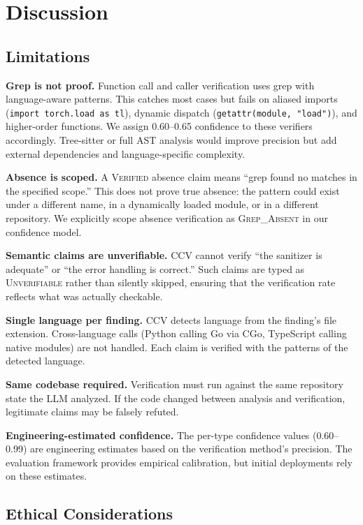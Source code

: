 \section{Discussion}
\label{sec:discussion}

\subsection{Limitations}

\textbf{Grep is not proof.} Function call and caller verification uses grep with language-aware patterns. This catches most cases but fails on aliased imports (\texttt{import torch.load as tl}), dynamic dispatch (\texttt{getattr(module, "load")}), and higher-order functions. We assign 0.60--0.65 confidence to these verifiers accordingly. Tree-sitter or full AST analysis would improve precision but add external dependencies and language-specific complexity.

\textbf{Absence is scoped.} A \textsc{Verified} absence claim means ``grep found no matches in the specified scope.'' This does not prove true absence: the pattern could exist under a different name, in a dynamically loaded module, or in a different repository. We explicitly scope absence verification as \textsc{Grep\_Absent} in our confidence model.

\textbf{Semantic claims are unverifiable.} CCV cannot verify ``the sanitizer is adequate'' or ``the error handling is correct.'' Such claims are typed as \textsc{Unverifiable} rather than silently skipped, ensuring that the verification rate reflects what was actually checkable.

\textbf{Single language per finding.} CCV detects language from the finding's file extension. Cross-language calls (Python calling Go via CGo, TypeScript calling native modules) are not handled. Each claim is verified with the patterns of the detected language.

\textbf{Same codebase required.} Verification must run against the same repository state the LLM analyzed. If the code changed between analysis and verification, legitimate claims may be falsely refuted.

\textbf{Engineering-estimated confidence.} The per-type confidence values (0.60--0.99) are engineering estimates based on the verification method's precision. The evaluation framework provides empirical calibration, but initial deployments rely on these estimates.

\subsection{Ethical Considerations}

